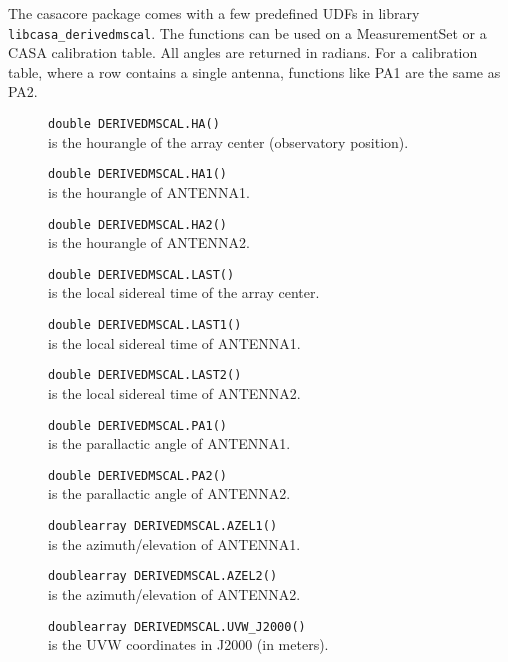 The casacore package comes with a few predefined UDFs in library
\texttt{libcasa\_derivedmscal}. The functions can be used on a
MeasurementSet or a CASA calibration table. 
All angles are returned in radians.
For a calibration table, where a row contains a single antenna, 
functions like PA1 are the same as PA2. 
\begin{description}
  \item[] \texttt{double DERIVEDMSCAL.HA()}\\
    is the hourangle of the array center (observatory position).
  \item[] \texttt{double DERIVEDMSCAL.HA1()}\\
    is the hourangle of ANTENNA1.
  \item[] \texttt{double DERIVEDMSCAL.HA2()}\\
    is the hourangle of ANTENNA2.
  \item[] \texttt{double DERIVEDMSCAL.LAST()}\\
    is the local sidereal time of the array center.
  \item[] \texttt{double DERIVEDMSCAL.LAST1()}\\
    is the local sidereal time of ANTENNA1.
  \item[] \texttt{double DERIVEDMSCAL.LAST2()}\\
    is the local sidereal time of ANTENNA2.
  \item[] \texttt{double DERIVEDMSCAL.PA1()}\\
    is the parallactic angle of ANTENNA1.
  \item[] \texttt{double DERIVEDMSCAL.PA2()}\\
    is the parallactic angle of ANTENNA2.
  \item[] \texttt{doublearray DERIVEDMSCAL.AZEL1()}\\
    is the azimuth/elevation of ANTENNA1.
  \item[] \texttt{doublearray DERIVEDMSCAL.AZEL2()}\\
    is the azimuth/elevation of ANTENNA2.
  \item[] \texttt{doublearray DERIVEDMSCAL.UVW\_J2000()}\\
    is the UVW coordinates in J2000 (in meters).
\end{description}


